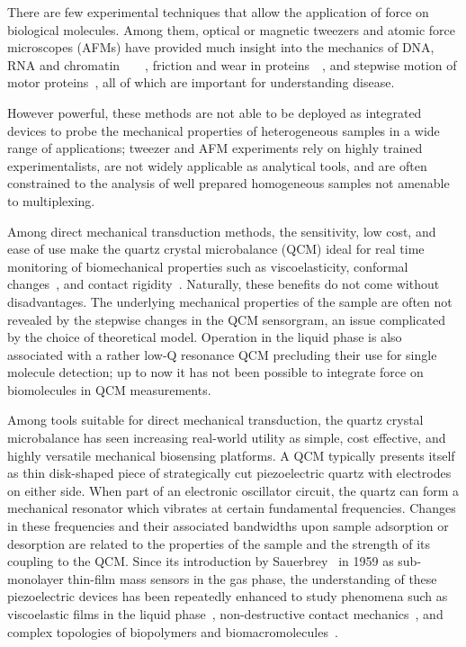 There are few experimental techniques that allow the application of force
on biological molecules. Among them, optical or magnetic tweezers and
atomic force microscopes (AFMs) have provided much insight into the
mechanics of DNA, RNA and
chromatin~\cite{felsenfeld1992chromatin}~\cite{cui2000pulling}~\cite{larson2012trigger}~\cite{marko1995stretching},
friction and wear in
proteins~\cite{suda2001origin}~\cite{bormuth2009protein}, and stepwise
motion of motor proteins~\cite{asbury2003kinesin}, all of which are
important for understanding disease.

However powerful, these methods are not able to be deployed as integrated
devices to probe the mechanical properties of heterogeneous samples in a
wide range of applications; tweezer and AFM experiments rely on highly
trained experimentalists, are not widely applicable as analytical tools,
and are often constrained to the analysis of well prepared homogeneous
samples not amenable to multiplexing.

Among direct mechanical transduction methods, the sensitivity, low cost,
and ease of use make the quartz crystal microbalance (QCM) ideal for real
time monitoring of biomechanical properties such as viscoelasticity,
conformal changes~\cite{fant2000adsorption}, and contact
rigidity~\cite{cooper2007survey}.  Naturally, these benefits
do not come without disadvantages. The underlying mechanical properties of
the sample are often not revealed by the stepwise changes in the QCM
sensorgram, an issue complicated by the choice of theoretical model.
Operation in the liquid phase is also associated with a rather low-Q
resonance QCM precluding their use for single molecule detection; up to now
it has not been possible to integrate force on biomolecules in QCM
measurements.

Among tools suitable for direct mechanical transduction, the quartz crystal
microbalance has seen increasing real-world utility as simple, cost
effective, and highly versatile mechanical biosensing platforms. A QCM
typically presents itself as thin disk-shaped piece of strategically cut
piezoelectric quartz with electrodes on either side. When part of an
electronic oscillator circuit, the quartz can form a mechanical resonator
which vibrates at certain fundamental frequencies. Changes in these frequencies
and their associated bandwidths upon sample adsorption or desorption are
related to the properties of the sample and the strength of its coupling to
the QCM. Since its introduction by Sauerbrey~\cite{sauerbrey1959verwendung}
in 1959 as sub-monolayer thin-film mass sensors in the gas phase, the
understanding of these piezoelectric devices has been repeatedly enhanced
to study phenomena such as viscoelastic films in the liquid
phase~\cite{kanazawa1985frequency}, non-destructive contact
mechanics~\cite{johannsman2007contacts}, and complex topologies of
biopolymers and biomacromolecules~\cite{marx2003quartz}. 


